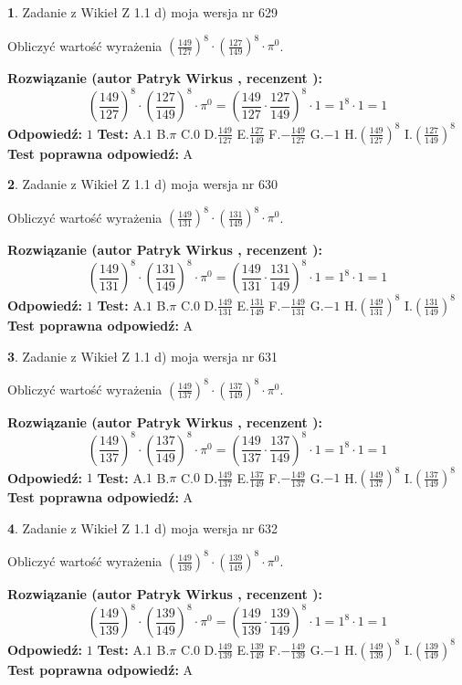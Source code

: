 \documentclass[12pt, a4paper]{article}
\theoremstyle{definition} %
\newtheorem{zad}{}
\newcommand{\zadStart}[1]{\begin{zad}#1\newline}
\newcommand{\zadStop}{\end{zad}}
\newcommand{\rozwStart}[2]{\noindent \textbf{Rozwiązanie (autor #1 , recenzent #2): }\newline}
\newcommand{\rozwStop}{\newline}
\newcommand{\odpStart}{\noindent \textbf{Odpowiedź:}\newline}
\newcommand{\odpStop}{\newline}
\newcommand{\testStart}{\noindent \textbf{Test:}\newline}
\newcommand{\testStop}{\newline}
\newcommand{\kluczStart}{\noindent \textbf{Test poprawna odpowiedź:}\newline}
\newcommand{\kluczStop}{\newline}
\begin{document}
\zadStart{Zadanie z Wikieł Z 1.1 d) moja wersja nr 629}

Obliczyć wartość wyrażenia $(\frac{149}{127})^{8} \cdot (\frac{127}{149})^{8} \cdot \pi^{0}$.
\zadStop
\rozwStart{Patryk Wirkus}{}
$$(\frac{149}{127})^{8} \cdot (\frac{127}{149})^{8} \cdot \pi^{0} = (\frac{149}{127} \cdot \frac{127}{149})^{8} \cdot 1 = 1^{8} \cdot 1 = 1$$
\rozwStop
\odpStart
$1$
\odpStop
\testStart
A.$1$ B.$\pi$ C.$0$ D.$\frac{149}{127}$ E.$\frac{127}{149}$
F.$-\frac{149}{127}$ G.$-1$
H.$(\frac{149}{127})^{8}$
I.$(\frac{127}{149})^{8}$
\testStop
\kluczStart
A
\kluczStop



\zadStart{Zadanie z Wikieł Z 1.1 d) moja wersja nr 630}

Obliczyć wartość wyrażenia $(\frac{149}{131})^{8} \cdot (\frac{131}{149})^{8} \cdot \pi^{0}$.
\zadStop
\rozwStart{Patryk Wirkus}{}
$$(\frac{149}{131})^{8} \cdot (\frac{131}{149})^{8} \cdot \pi^{0} = (\frac{149}{131} \cdot \frac{131}{149})^{8} \cdot 1 = 1^{8} \cdot 1 = 1$$
\rozwStop
\odpStart
$1$
\odpStop
\testStart
A.$1$ B.$\pi$ C.$0$ D.$\frac{149}{131}$ E.$\frac{131}{149}$
F.$-\frac{149}{131}$ G.$-1$
H.$(\frac{149}{131})^{8}$
I.$(\frac{131}{149})^{8}$
\testStop
\kluczStart
A
\kluczStop



\zadStart{Zadanie z Wikieł Z 1.1 d) moja wersja nr 631}

Obliczyć wartość wyrażenia $(\frac{149}{137})^{8} \cdot (\frac{137}{149})^{8} \cdot \pi^{0}$.
\zadStop
\rozwStart{Patryk Wirkus}{}
$$(\frac{149}{137})^{8} \cdot (\frac{137}{149})^{8} \cdot \pi^{0} = (\frac{149}{137} \cdot \frac{137}{149})^{8} \cdot 1 = 1^{8} \cdot 1 = 1$$
\rozwStop
\odpStart
$1$
\odpStop
\testStart
A.$1$ B.$\pi$ C.$0$ D.$\frac{149}{137}$ E.$\frac{137}{149}$
F.$-\frac{149}{137}$ G.$-1$
H.$(\frac{149}{137})^{8}$
I.$(\frac{137}{149})^{8}$
\testStop
\kluczStart
A
\kluczStop



\zadStart{Zadanie z Wikieł Z 1.1 d) moja wersja nr 632}

Obliczyć wartość wyrażenia $(\frac{149}{139})^{8} \cdot (\frac{139}{149})^{8} \cdot \pi^{0}$.
\zadStop
\rozwStart{Patryk Wirkus}{}
$$(\frac{149}{139})^{8} \cdot (\frac{139}{149})^{8} \cdot \pi^{0} = (\frac{149}{139} \cdot \frac{139}{149})^{8} \cdot 1 = 1^{8} \cdot 1 = 1$$
\rozwStop
\odpStart
$1$
\odpStop
\testStart
A.$1$ B.$\pi$ C.$0$ D.$\frac{149}{139}$ E.$\frac{139}{149}$
F.$-\frac{149}{139}$ G.$-1$
H.$(\frac{149}{139})^{8}$
I.$(\frac{139}{149})^{8}$
\testStop
\kluczStart
A
\kluczStop
\end{document}
